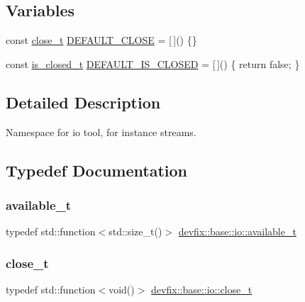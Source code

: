 \subsection*{Variables}
\begin{DoxyCompactItemize}
\item 
const \hyperlink{namespacedevfix_1_1base_1_1io_ae3118387742e5f4d484a328a213d6a5d}{close\+\_\+t} \hyperlink{namespacedevfix_1_1base_1_1io_a14a286c17d4b93881d42b1d14beb2d0b}{D\+E\+F\+A\+U\+L\+T\+\_\+\+C\+L\+O\+SE} = \mbox{[}$\,$\mbox{]}() \{\}
\item 
const \hyperlink{namespacedevfix_1_1base_1_1io_a14f89d4437ced6ede49c044ee8e71f17}{is\+\_\+closed\+\_\+t} \hyperlink{namespacedevfix_1_1base_1_1io_ae04fec2a2a2db3482e624a59e59a2a14}{D\+E\+F\+A\+U\+L\+T\+\_\+\+I\+S\+\_\+\+C\+L\+O\+S\+ED} = \mbox{[}$\,$\mbox{]}() \{ return false; \}
\end{DoxyCompactItemize}


\subsection{Detailed Description}
Namespace for io tool, for instance streams. 

\subsection{Typedef Documentation}
\mbox{\label{namespacedevfix_1_1base_1_1io_a19c1195ab6a44e6d4f48b86062860a11}} 
\subsubsection{\texorpdfstring{available\+\_\+t}{available\_t}}
{\footnotesize\ttfamily typedef std\+::function$<$std\+::size\+\_\+t()$>$ \hyperlink{namespacedevfix_1_1base_1_1io_a19c1195ab6a44e6d4f48b86062860a11}{devfix\+::base\+::io\+::available\+\_\+t}}

\mbox{\label{namespacedevfix_1_1base_1_1io_ae3118387742e5f4d484a328a213d6a5d}} 
\subsubsection{\texorpdfstring{close\+\_\+t}{close\_t}}
{\footnotesize\ttfamily typedef std\+::function$<$void()$>$ \hyperlink{namespacedevfix_1_1base_1_1io_ae3118387742e5f4d484a328a213d6a5d}{devfix\+::base\+::io\+::close\+\_\+t}}

